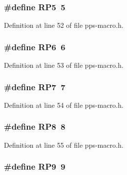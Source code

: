 \subsubsection[{R\+P5}]{\setlength{\rightskip}{0pt plus 5cm}\#define R\+P5~5}\label{pps-macro_8h_abbc5745deef7e3b20d10bdccc0771dd4}


Definition at line 52 of file pps-\/macro.\+h.

\hypertarget{pps-macro_8h_a4295b175e0b35b5d0fa0a2f4ddd5c500}{}
\subsubsection[{R\+P6}]{\setlength{\rightskip}{0pt plus 5cm}\#define R\+P6~6}\label{pps-macro_8h_a4295b175e0b35b5d0fa0a2f4ddd5c500}


Definition at line 53 of file pps-\/macro.\+h.

\hypertarget{pps-macro_8h_a3f41b08943acfc860b64f28ee037e43a}{}
\subsubsection[{R\+P7}]{\setlength{\rightskip}{0pt plus 5cm}\#define R\+P7~7}\label{pps-macro_8h_a3f41b08943acfc860b64f28ee037e43a}


Definition at line 54 of file pps-\/macro.\+h.

\hypertarget{pps-macro_8h_a523ffc0b5ece9e397e947475fe951dc4}{}
\subsubsection[{R\+P8}]{\setlength{\rightskip}{0pt plus 5cm}\#define R\+P8~8}\label{pps-macro_8h_a523ffc0b5ece9e397e947475fe951dc4}


Definition at line 55 of file pps-\/macro.\+h.

\hypertarget{pps-macro_8h_a96986fa0e473c3b95c6d7c479c21ebce}{}
\subsubsection[{R\+P9}]{\setlength{\rightskip}{0pt plus 5cm}\#define R\+P9~9}\label{pps-macro_8h_a96986fa0e473c3b95c6d7c479c21ebce}



